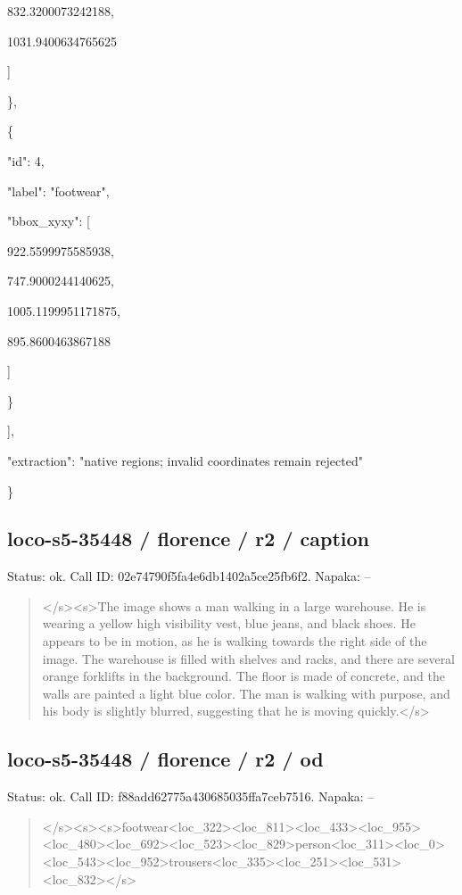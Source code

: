 \documentclass[10pt,a4paper]{article}
\begin{document}
        832.3200073242188,\allowbreak{}\par
        1031.9400634765625\par
      ]\par
    \},\allowbreak{}\par
    \{\par
      "id":\allowbreak{} 4,\allowbreak{}\par
      "label":\allowbreak{} "footwear",\allowbreak{}\par
      "bbox\_xyxy":\allowbreak{} [\par
        922.5599975585938,\allowbreak{}\par
        747.9000244140625,\allowbreak{}\par
        1005.1199951171875,\allowbreak{}\par
        895.8600463867188\par
      ]\par
    \}\par
  ],\allowbreak{}\par
  "extraction":\allowbreak{} "native regions; invalid coordinates remain rejected"\par
\}
\subsection*{loco-s5-35448 / florence / r2 / caption}
Status: ok. Call ID: 02e74790f5fa4e6db1402a5ce25fb6f2. Napaka: --
\begin{quote}\footnotesize
</s>\allowbreak{}<s>\allowbreak{}The image shows a man walking in a large warehouse. He is wearing a yellow high visibility vest,\allowbreak{} blue jeans,\allowbreak{} and black shoes. He appears to be in motion,\allowbreak{} as he is walking towards the right side of the image. The warehouse is filled with shelves and racks,\allowbreak{} and there are several orange forklifts in the background. The floor is made of concrete,\allowbreak{} and the walls are painted a light blue color. The man is walking with purpose,\allowbreak{} and his body is slightly blurred,\allowbreak{} suggesting that he is moving quickly.</s>\allowbreak{}
\end{quote}
\subsection*{loco-s5-35448 / florence / r2 / od}
Status: ok. Call ID: f88add62775a430685035ffa7ceb7516. Napaka: --
\begin{quote}\footnotesize
</s>\allowbreak{}<s>\allowbreak{}<s>\allowbreak{}footwear<loc\_322>\allowbreak{}<loc\_\allowbreak{}811>\allowbreak{}<loc\_433>\allowbreak{}<loc\_955>\allowbreak{}<loc\_480>\allowbreak{}<\allowbreak{}loc\_692>\allowbreak{}<loc\_523>\allowbreak{}<loc\_829>\allowbreak{}person\allowbreak{}<loc\_311>\allowbreak{}<loc\_0>\allowbreak{}<loc\_543>\allowbreak{}<loc\_95\allowbreak{}2>\allowbreak{}trousers<loc\_335>\allowbreak{}<loc\_251>\allowbreak{}<loc\allowbreak{}\_531>\allowbreak{}<loc\_832>\allowbreak{}</s>\allowbreak{}
\end{quote}
\end{document}
